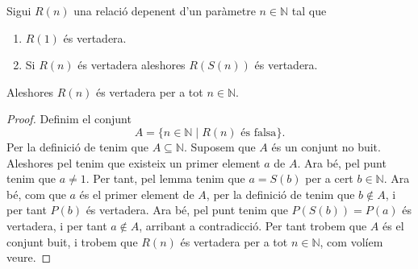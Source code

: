 \documentclass[../Apunts.tex]{subfiles}
\begin{document}
	\begin{theorem}
		\label{thm:principi d'inducció}
		Sigui \(R(n)\) una relació depenent d'un paràmetre \(n\in\mathbb{N}\) tal que
		\begin{enumerate}
			\item\label{enum:thm:principi d'inducció 1} \(R(1)\) és vertadera.
			\item\label{enum:thm:principi d'inducció 2} Si \(R(n)\) és vertadera aleshores \(R(S(n))\) és vertadera.
		\end{enumerate}
		Aleshores \(R(n)\) és vertadera per a tot \(n\in\mathbb{N}\).
		\begin{proof}
			Definim el conjunt
			\[A=\{n\in\mathbb{N}\mid R(n)\text{ és falsa}\}.\]
			Per la definició de  tenim que \(A\subseteq\mathbb{N}\). Suposem que \(A\) és un conjunt no buit. Aleshores pel  tenim que existeix un primer element \(a\) de \(A\). Ara bé, pel punt  tenim que \(a\neq1\). Per tant, pel lemma  tenim que \(a=S(b)\) per a cert \(b\in\mathbb{N}\). Ara bé, com que \(a\) és el primer element de \(A\), per la definició de  tenim que \(b\notin A\), i per tant \(P(b)\) és vertadera. Ara bé, pel punt  tenim que \(P(S(b))=P(a)\) és vertadera, i per tant \(a\notin A\), arribant a contradicció. Per tant trobem que \(A\) és el conjunt buit, i trobem que \(R(n)\) és vertadera per a tot \(n\in\mathbb{N}\), com volíem veure.
		\end{proof}
	\end{theorem}
\end{document}
